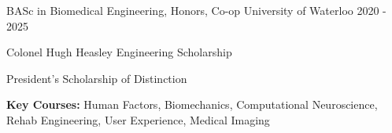 \documentclass[11pt, a4paper]{russell}
\begin{document}
\makecvheader

\begin{cventries}
    \cventry
        {BASc in Biomedical Engineering, Honors, Co-op} %
        {University of Waterloo} %
        {} %
        {2020 - 2025} %
        {
          \begin{cvitems}
            \item {Colonel Hugh Heasley Engineering Scholarship}
            \item {President's Scholarship of Distinction}
            \item {\textbf{Key Courses:} Human Factors, Biomechanics, Computational Neuroscience, Rehab Engineering, User Experience, Medical Imaging}
          \end{cvitems}
        }
\end{cventries}
\end{document}
